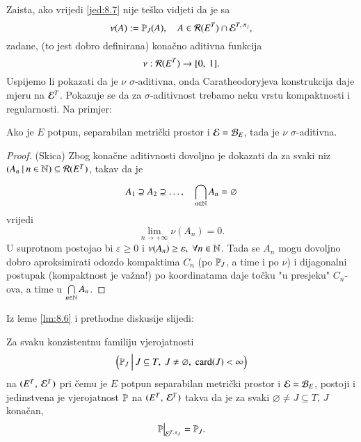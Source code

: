 Zaista, ako vrijedi \eqref{jed:8.7} nije te\v sko vidjeti da je sa
\begin{equation*}
    \nu (A) := \mathbb{P}_J (A), \quad A \in \mathcal{R}({E^T}) \cap \mathcal{E}^{T, \: \pi_j},
\end{equation*}
zadane, (to jest dobro definirana) kona\v cno aditivna funkcija
\begin{equation*}
    \nu : \mathcal{R}({E^T}) \to [{0}, \:{1}].
\end{equation*}
Uspijemo li pokazati da je $\nu$ $\sigma$-aditivna, onda Caratheodoryjeva konstrukcija daje mjeru na $\mathcal{E}^T$.
Pokazuje se da za $\sigma$-aditivnost trebamo neku vrstu kompaktnosti i regularnosti.
Na primjer:

\begin{lm}  \label{lm:8.6}
    Ako je $E$ potpun, separabilan metri\v cki prostor i $\mathcal{E} = \mathcal{B}_{E}$, tada je $\nu$ $\sigma$-aditivna.
\end{lm}

\begin{proof}{(Skica)}
    Zbog kona\v cne aditivnosti dovoljno je dokazati da za svaki niz $({A_n} \: | \: {n \in \mathbb{N}}) \subseteq \mathcal{R}({E^T})$, takav da je
    \begin{equation*}
        A_1 \supseteq A_2 \supseteq \ldots, \quad \bigcap\limits_{n \in \mathbb{N}}^{} A_n = \varnothing
    \end{equation*}
    vrijedi
    \begin{equation*}
        \lim\limits_{n \to +\infty} \nu (A_n) = 0.
    \end{equation*}
    U suprotnom postojao bi $\varepsilon \geq 0$ i $\nu (A_n) \geq \varepsilon, \; \forall n \in \mathbb{N}$.
    Tada se $A_n$ mogu dovoljno dobro aproksimirati odozdo kompaktima $C_n$ (po $\mathbb{P}_J$, a time i po $\nu$) i dijagonalni postupak (kompaktnost je va\v zna!) po koordinatama daje to\v cku "u presjeku" $C_n$-ova, a time u $\bigcap\limits_{n \in \mathbb{N}}^{} A_n$.
\end{proof}

Iz leme \ref{lm:8.6} i prethodne diskusije slijedi:

\begin{tm}[Kolmogorov]    \label{tm:8.9}
    Za svaku konzistentnu familiju vjerojatnosti
    \begin{equation*}
        \Big( {\mathbb{P}_J} \: \Big| \: {J \subseteq T, \; J \neq \varnothing, \; \mathrm{card}({J}) < \infty} \Big)
    \end{equation*}
    na $({E^T}, \: {\mathcal{E}^T})$ pri \v cemu je $E$ potpun separabilan metri\v cki prostor i $\mathcal{E} = \mathcal{B}_{E}$, postoji i jedinstvena je vjerojatnost $\mathbb{P}$ na $({E^T}, \: {\mathcal{E}^T})$ takva da je za svaki $\varnothing \neq J \subseteq T$, $J$ kona\v can,
    \begin{equation*}
        \restr{\masP}{\famE^{T, \: \pi_J}} = \masP_J.
    \end{equation*}
\end{tm}

